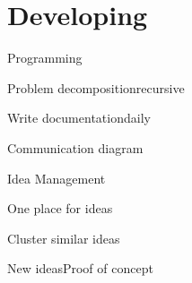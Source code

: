 
\section{Developing}
\begin{checklist}{Programming}
  \item{Problem decomposition}{recursive}
  \item{Write documentation}{daily}
  \item{Communication diagram}{}
\end{checklist}

\begin{checklist}{Idea Management}
\item{One place for ideas}{}
\item{Cluster similar ideas}{}
\item{New ideas}{Proof of concept}
\end{checklist}


